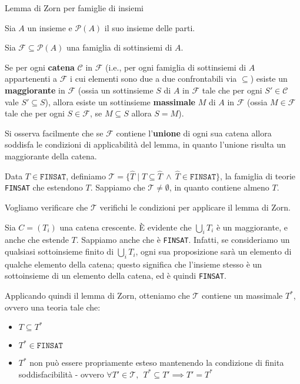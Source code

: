 \documentclass[a4paper,11pt]{report}
\begin{document}
\begin{lemmabox}{Lemma di Zorn per famiglie di insiemi}{}

Sia $A$ un insieme e $\mathcal{P}(A)$ il suo insieme delle parti. 

Sia $\mathcal{F} \subseteq \mathcal{P}(A)$ una famiglia di sottinsiemi di $A$. 

Se per ogni \textbf{catena} $\mathcal{C}$ in $\mathcal{F}$ (i.e., per ogni famiglia di sottinsiemi di $A$ appartenenti a $\mathcal{F}$ i cui elementi sono due a due confrontabili via $\subseteq$) esiste un \textbf{maggiorante} in $\mathcal{F}$ (ossia un sottinsieme $S$ di $A$ in $\mathcal{F}$ tale che per ogni $S' \in \mathcal{C}$ vale $S' \subseteq S$), allora esiste un sottinsieme \textbf{massimale} $M$ di $A$ in $\mathcal{F}$ (ossia $M \in \mathcal{F}$ tale che per ogni $S \in \mathcal{F}$, se $M \subseteq S$ allora $S = M$).

\begin{gbox}{}
    Si osserva facilmente che se $\mathcal{F}$ contiene l'\textbf{unione} di ogni sua catena allora soddisfa le condizioni di applicabilità del lemma, in quanto l'unione risulta un maggiorante della catena.

\end{gbox}

\end{lemmabox}

Data \( T \in \texttt{FINSAT} \), definiamo \( \mathcal{T} = \{\hat T \mid T \subseteq \hat T \ \land \  \hat T \in \texttt{FINSAT}\} \), la famiglia di teorie \texttt{FINSAT} che estendono \( T \). Sappiamo che \( \mathcal{T}\neq \emptyset \), in quanto contiene almeno \( T \).

Vogliamo verificare che \( \mathcal{T} \) verifichi le condizioni per applicare il lemma di Zorn.

Sia \( C = (T_i) \) una catena crescente. È evidente che \( \bigcup_i T_i\) è un maggiorante, e anche che estende \(T\). Sappiamo anche che è \texttt{FINSAT}. Infatti, se consideriamo un qualsiasi sottoinsieme finito di \( \bigcup_i T_i\), ogni sua proposizione sarà un elemento di qualche elemento della catena; questo significa che l'insieme stesso è un sottoinsieme di un elemento della catena, ed è quindi \texttt{FINSAT}.

Applicando quindi il lemma di Zorn, otteniamo che \( \mathcal{T} \) contiene un massimale \( T^* \), ovvero una teoria tale che:
\begin{itemize}
    \item \( T \subseteq T^* \)
    \item \( T^* \in \texttt{FINSAT}\)
    \item \( T^* \) non può essere propriamente esteso mantenendo la condizione di finita soddisfacibilità - ovvero \( \forall T' \in \mathcal{T}, \ \ T^* \subseteq T' \implies T' = T^* \)
\end{itemize}
\end{document}
